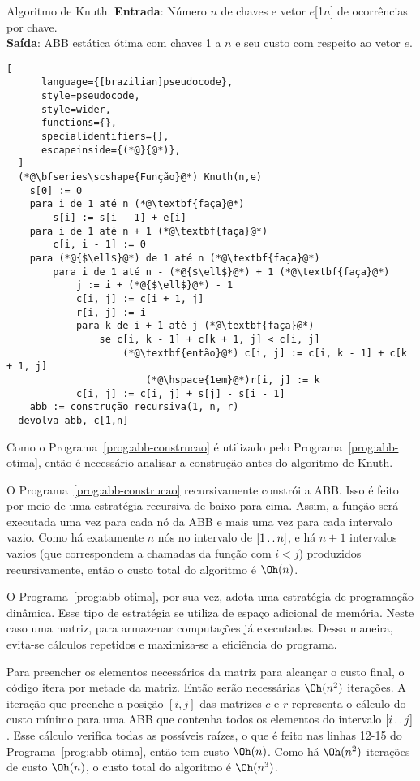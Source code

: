 \begin{programruledcaption}{Algoritmo de Knuth.\label{prog:abb-otima}}
  \noindent\textbf{Entrada}: Número $n$ de chaves e vetor $e$[1\tdots$n$] de ocorrências por chave. \\
  \textbf{Saída}: ABB estática ótima com chaves 1 a $n$ e seu custo com respeito ao vetor $e$.
  \vspace{-0.5\baselineskip}
  \begin{lstlisting}[
      language={[brazilian]pseudocode},
      style=pseudocode,
      style=wider,
      functions={},
      specialidentifiers={},
      escapeinside={(*@}{@*)},
  ]
  (*@\bfseries\scshape{Função}@*) Knuth(n,e)
    s[0] := 0
    para i de 1 até n (*@\textbf{faça}@*)
        s[i] := s[i - 1] + e[i]
    para i de 1 até n + 1 (*@\textbf{faça}@*)
        c[i, i - 1] := 0
    para (*@{$\ell$}@*) de 1 até n (*@\textbf{faça}@*)
        para i de 1 até n - (*@{$\ell$}@*) + 1 (*@\textbf{faça}@*)
            j := i + (*@{$\ell$}@*) - 1
            c[i, j] := c[i + 1, j]
            r[i, j] := i
            para k de i + 1 até j (*@\textbf{faça}@*)
                se c[i, k - 1] + c[k + 1, j] < c[i, j]
                    (*@\textbf{então}@*) c[i, j] := c[i, k - 1] + c[k + 1, j]
                        (*@\hspace{1em}@*)r[i, j] := k
            c[i, j] := c[i, j] + s[j] - s[i - 1]
    abb := construção_recursiva(1, n, r)
  devolva abb, c[1,n]
  \end{lstlisting}
  \vspace{-0.5\baselineskip}
\end{programruledcaption}

Como o Programa~\ref{prog:abb-construcao} é utilizado pelo Programa~\ref{prog:abb-otima}, então é necessário analisar a construção antes do algoritmo de Knuth.

O Programa~\ref{prog:abb-construcao} recursivamente constrói a ABB. Isso é feito por meio de uma estratégia recursiva de baixo para cima. Assim, a função será executada uma vez para cada nó da ABB e mais uma vez para cada intervalo vazio. Como há exatamente $n$ nós no intervalo de $[1 {\,.\,.\,} n]$, e há $n+1$ intervalos vazios (que correspondem a chamadas da função com $i<j$) produzidos recursivamente, então o custo total do algoritmo é $\Oh(n)$.

O Programa~\ref{prog:abb-otima}, por sua vez, adota uma estratégia de programação dinâmica. Esse tipo de estratégia se utiliza de espaço adicional de memória. Neste caso uma matriz, para armazenar computações já executadas. Dessa maneira, evita-se cálculos repetidos e maximiza-se a eficiência do programa.

Para preencher os elementos necessários da matriz para alcançar o custo final, o código itera por metade da matriz. Então serão necessárias $\Oh(n^2)$ iterações. A iteração que preenche a posição $[i,j]$ das matrizes $c$ e $r$ representa o cálculo do custo mínimo para uma ABB que contenha todos os elementos do intervalo $[i {\,.\,.\,} j]$. Esse cálculo verifica todas as possíveis raízes, o que é feito nas linhas 12-15 do Programa~\ref{prog:abb-otima}, então tem custo $\Oh(n)$. Como há $\Oh(n^2)$ iterações de custo $\Oh(n)$, o custo total do algoritmo é $\Oh(n^3)$. 



